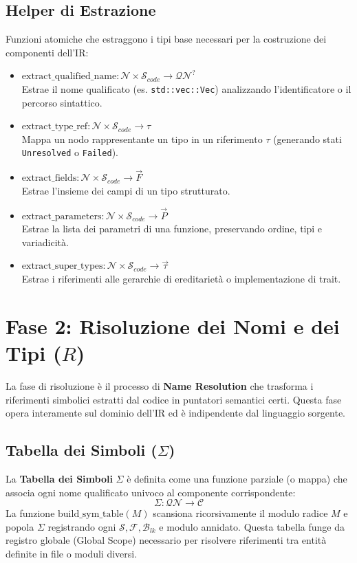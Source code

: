 \subsection{Helper di Estrazione}
Funzioni atomiche che estraggono i tipi base necessari per la
costruzione dei componenti dell'IR:
\begin{itemize}
  \item $\text{extract\_qualified\_name} : \mathcal{N} \times
    \mathcal{S}_{code} \to \mathcal{QN}^?$ \\
    Estrae il nome qualificato (es. \texttt{std::vec::Vec})
    analizzando l'identificatore o il percorso sintattico.
  \item $\text{extract\_type\_ref} : \mathcal{N} \times
    \mathcal{S}_{code} \to \tau$ \\
    Mappa un nodo rappresentante un tipo in un riferimento $\tau$
    (generando stati \texttt{Unresolved} o \texttt{Failed}).
  \item $\text{extract\_fields} : \mathcal{N} \times
    \mathcal{S}_{code} \to \vec{F}$ \\
    Estrae l'insieme dei campi di un tipo strutturato.
  \item $\text{extract\_parameters} : \mathcal{N} \times
    \mathcal{S}_{code} \to \vec{P}$ \\
    Estrae la lista dei parametri di una funzione, preservando
    ordine, tipi e variadicità.
  \item $\text{extract\_super\_types} : \mathcal{N} \times
    \mathcal{S}_{code} \to \vec{\tau}$ \\
    Estrae i riferimenti alle gerarchie di ereditarietà o
    implementazione di trait.
\end{itemize}

\section{Fase 2: Risoluzione dei Nomi e dei Tipi ($R$)}
La fase di risoluzione è il processo di \textbf{Name Resolution} che
trasforma i riferimenti simbolici estratti dal codice in puntatori
semantici certi. Questa fase opera interamente sul dominio dell'IR ed
è indipendente dal linguaggio sorgente.

\subsection{Tabella dei Simboli ($\Sigma$)}
La \textbf{Tabella dei Simboli} $\Sigma$ è definita come una funzione
parziale (o mappa) che associa ogni nome qualificato univoco al
componente corrispondente:
$$\Sigma : \mathcal{QN} \to \mathcal{C}$$
La funzione $\text{build\_sym\_table}(M)$ scansiona ricorsivamente il
modulo radice $M$ e popola $\Sigma$ registrando ogni $\mathcal{S},
\mathcal{F}, \mathcal{B}_{lk}$ e modulo annidato. Questa tabella
funge da registro globale (Global Scope) necessario per risolvere
riferimenti tra entità definite in file o moduli diversi.

